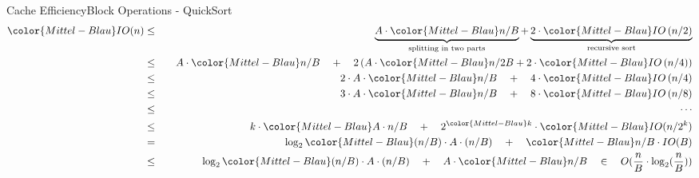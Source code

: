 \begin{frame}{Cache Efficiency}{Block Operations - QuickSort}
{\color{Mittel-Blau}
  \begin{eqnarray*}
    {\color{Mittel-Blau}IO(n)} &\leq\hspace{1em}&
      \underbrace{
        A \cdot {\color{Mittel-Blau}n / B}
      }_{\text{splitting in two parts}}
      +
      \underbrace{
        2 \cdot {\color{Mittel-Blau}IO\left(n / 2 \right)}
      }_{\text{recursive sort}}\\
    {} &\leq&
      A \cdot {\color{Mittel-Blau} n / B} \hspace{1em}+ \hspace{1em}2 \left(
        A \cdot {\color{Mittel-Blau} n /2 B}
        + 2 \cdot {\color{Mittel-Blau}IO\left( n / 4 \right)}
      \right)\\
    {} &\leq&
      2 \cdot A \cdot {\color{Mittel-Blau} n / B}
      \hspace{1em}+ \hspace{1em}4 \cdot {\color{Mittel-Blau}IO\left( n / 4 \right)}\\
    {} &\leq&
      3 \cdot A \cdot {\color{Mittel-Blau} n / B}
      \hspace{1em}+ \hspace{1em}8 \cdot {\color{Mittel-Blau}IO\left( n / 8 \right)}\\  
    {} &\leq&\hspace{1.5em}\cdots\\
    {} &\leq&
      k \cdot {\color{Mittel-Blau}A \cdot n /B }
      \hspace{1em}+\hspace{1em} 2^{\color{Mittel-Blau}k}
      \cdot {\color{Mittel-Blau}IO(n / 2^k)}\\
    {} &=&
      \log_2 {\color{Mittel-Blau} (n / B) \cdot A \cdot (n / B)}
      \hspace{1em}+\hspace{1em} {\color{Mittel-Blau} n /B \cdot IO(B)}\\
    {} &\leq&
      \log_2 {\color{Mittel-Blau} (n /B) \cdot A \cdot (n / B)}
      \hspace{1em}+\hspace{1em} A \cdot {\color{Mittel-Blau} n/ B }
      \hspace{1em} \in \hspace{1em} O(\frac{n}{B}  \cdot \log_2 (\frac{n}{B}) )
  \end{eqnarray*}}
\end{frame}
